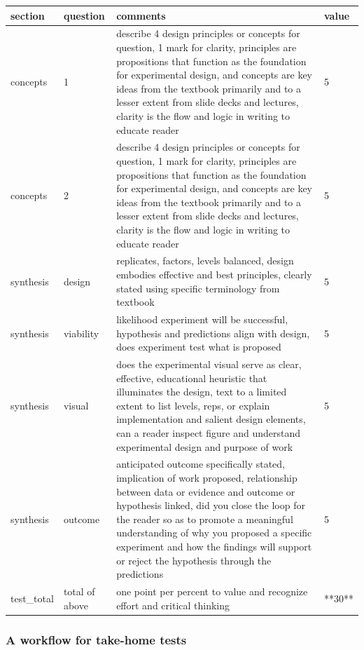 \documentclass[
]{book}
\begin{document}
\begin{tabular}{l|l|l|l}
\hline
section & question & comments & value\\
\hline
concepts & 1 & describe 4 design principles or concepts for question, 1 mark for clarity, principles are propositions that function as the foundation for experimental design, and concepts are key ideas from the textbook primarily and to a lesser extent from slide decks and lectures, clarity is the flow and logic in writing to educate reader & 5\\
\hline
concepts & 2 & describe 4 design principles or concepts for question, 1 mark for clarity, principles are propositions that function as the foundation for experimental design, and concepts are key ideas from the textbook primarily and to a lesser extent from slide decks and lectures, clarity is the flow and logic in writing to educate reader & 5\\
\hline
synthesis & design & replicates, factors, levels balanced, design embodies effective and best principles, clearly stated using specific terminology from textbook & 5\\
\hline
synthesis & viability & likelihood experiment will be successful, hypothesis and predictions align with design, does experiment test what is proposed & 5\\
\hline
synthesis & visual & does the experimental visual serve as clear, effective, educational heuristic that illuminates the design, text to a limited extent to list levels, reps, or explain implementation and salient design elements, can a reader inspect figure and understand experimental design and purpose of work & 5\\
\hline
synthesis & outcome & anticipated outcome specifically stated, implication of work proposed, relationship between data or evidence and outcome or hypothesis linked, did you close the loop for the reader so as to promote a meaningful understanding of why you proposed a specific experiment and how the findings will support or reject the hypothesis through the predictions & 5\\
\hline
test\_total & total of above & one point per percent to value and recognize effort and critical thinking & **30**\\
\hline
\end{tabular}

\hypertarget{a-workflow-for-take-home-tests}{%
\subsubsection*{A workflow for take-home tests}\label{a-workflow-for-take-home-tests}}
\end{document}
